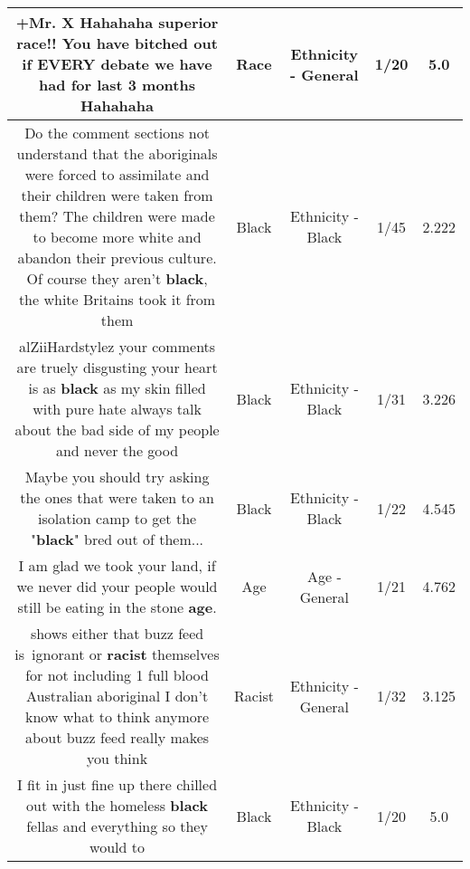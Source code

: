 \documentclass[11pt]{article}
\newlength\mylength
\begin{document}
\begin{center}
\begin{longtable}{|C{.65\mylength}|C{.30\mylength}|C{.12\mylength}|C{.12\mylength}|C{.12\mylength}|}
  \small +Mr. X Hahahaha superior \textbf{race}!! You have bitched out if EVERY debate we have had for last 3 months Hahahaha\normalsize   & Race & Ethnicity - General & 1/20 & 5.0 \\  \hline
  \small Do the comment sections not understand that the aboriginals were forced to assimilate and their children were taken from them? The children were made to become more white and abandon their previous culture. Of course they aren't \textbf{black}, the white Britains took it from them\normalsize   & Black & Ethnicity - Black & 1/45 & 2.222 \\  \hline
  \small alZiiHardstylez your comments are truely disgusting your heart is as \textbf{black} as my skin filled with pure hate always talk about the bad side of my people and never the good\normalsize   & Black & Ethnicity - Black & 1/31 & 3.226 \\  \hline
  \small Maybe you should try asking the ones that were taken to an isolation camp to get the "\textbf{black}" bred out of them...\normalsize   & Black & Ethnicity - Black & 1/22 & 4.545 \\  \hline
  \small I am glad we took your land, if we never did your people would still be eating in the stone \textbf{age}.\normalsize   & Age & Age - General & 1/21 & 4.762 \\  \hline
  \small shows either that buzz feed is ignorant or \textbf{racist} themselves for not including 1 full blood Australian aboriginal I don't know what to think anymore about buzz feed really makes you think\normalsize   & Racist & Ethnicity - General & 1/32 & 3.125 \\  \hline
  \small I fit in just fine up there chilled out with the homeless \textbf{black} fellas and everything so they would to\normalsize   & Black & Ethnicity - Black & 1/20 & 5.0 \\  \hline

\end{longtable}
\end{center}
\end{document}
